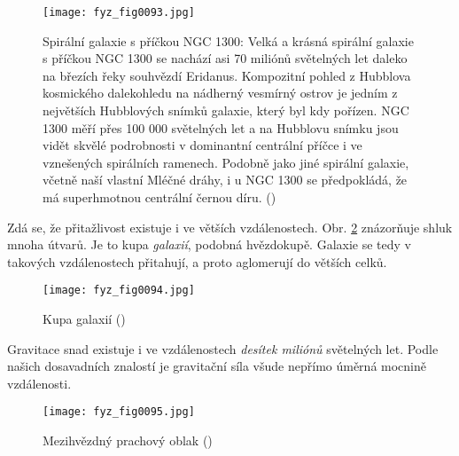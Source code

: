     \begin{figure}[ht!]  %
      \centering
      \texttt{[image: fyz\_fig0093.jpg]}
      \caption{Spirální galaxie s příčkou NGC 1300: Velká a krásná spirální galaxie s příčkou NGC
       1300 se nachází asi 70 miliónů světelných let daleko na březích řeky souhvězdí Eridanus.
       Kompozitní pohled z Hubblova kosmického dalekohledu na nádherný vesmírný ostrov je jedním z
       největších Hubblových snímků galaxie, který byl kdy pořízen. NGC 1300 měří přes 100 000
       světelných let a na Hubblovu snímku jsou vidět skvělé podrobnosti v dominantní centrální
       příčce i ve vznešených spirálních ramenech.  Podobně jako jiné spirální galaxie, včetně naší
       vlastní Mléčné dráhy, i u NGC 1300 se předpokládá, že má superhmotnou centrální černou díru.
       (\cite[s.~99]{Feynman01})}
      \label{fyz:fig0093}
    \end{figure}
    
    Zdá se, že přitažlivost existuje i ve větších vzdálenostech. Obr. \ref{fyz:fig0094} znázorňuje 
    shluk mnoha  útvarů. Je to kupa \emph{galaxií}, podobná hvězdokupě. Galaxie se 
    tedy v takových vzdálenostech přitahují, a proto aglomerují do větších celků.

    \begin{figure}[ht!]  %
      \centering
      \texttt{[image: fyz\_fig0094.jpg]}
      \caption{Kupa galaxií (\cite[s.~100]{Feynman01})}
      \label{fyz:fig0094}
    \end{figure}
    
    Gravitace snad existuje i ve vzdálenostech \emph{desítek miliónů} světelných let. Podle našich 
    dosavadních znalostí je gravitační síla všude nepřímo úměrná mocnině vzdálenosti. 

    \begin{figure}[ht!]  %
      \centering
      \texttt{[image: fyz\_fig0095.jpg]}
      \caption{Mezihvězdný prachový oblak (\cite[s.~101]{Feynman01})}
      \label{fyz:fig0095}
    \end{figure}
    

